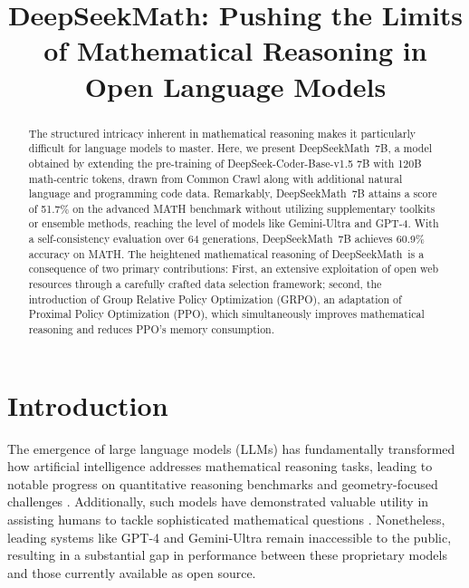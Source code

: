 \title{DeepSeekMath: Pushing the Limits of Mathematical Reasoning in Open Language Models}

\begin{abstract}
The structured intricacy inherent in mathematical reasoning makes it particularly difficult for language models to master. Here, we present DeepSeekMath~7B, a model obtained by extending the pre-training of DeepSeek-Coder-Base-v1.5 7B with 120B math-centric tokens, drawn from Common Crawl along with additional natural language and programming code data. Remarkably, DeepSeekMath~7B attains a score of 51.7\% on the advanced MATH benchmark without utilizing supplementary toolkits or ensemble methods, reaching the level of models like Gemini-Ultra and GPT-4. With a self-consistency evaluation over 64 generations, DeepSeekMath~7B achieves 60.9\% accuracy on MATH. The heightened mathematical reasoning of DeepSeekMath~is a consequence of two primary contributions: First, an extensive exploitation of open web resources through a carefully crafted data selection framework; second, the introduction of Group Relative Policy Optimization (GRPO), an adaptation of Proximal Policy Optimization (PPO), which simultaneously improves mathematical reasoning and reduces PPO's memory consumption.
\end{abstract}

\section{Introduction}

The emergence of large language models (LLMs) has fundamentally transformed how artificial intelligence addresses mathematical reasoning tasks, leading to notable progress on quantitative reasoning benchmarks \citep{MATH} and geometry-focused challenges \citep{trinh2024solving}. Additionally, such models have demonstrated valuable utility in assisting humans to tackle sophisticated mathematical questions \citep{tao}. Nonetheless, leading systems like GPT-4 \citep{gpt4} and Gemini-Ultra \citep{gemini} remain inaccessible to the public, resulting in a substantial gap in performance between these proprietary models and those currently available as open source.


